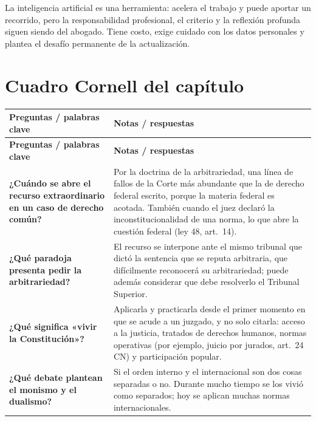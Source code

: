 \documentclass[12pt,oneside]{book}
\begin{document}
\begin{important}
La inteligencia artificial es una herramienta: acelera el trabajo y puede aportar un recorrido, pero la responsabilidad profesional, el criterio y la reflexión profunda siguen siendo del abogado. Tiene costo, exige cuidado con los datos personales y plantea el desafío permanente de la actualización.
\end{important}

\section{Cuadro Cornell del capítulo}

\begin{longtable}{>{\raggedright\arraybackslash}p{}>{\raggedright\arraybackslash}p{}}
\toprule
\textbf{Preguntas / palabras clave} & \textbf{Notas / respuestas} \\
\midrule
\endfirsthead
\toprule
\textbf{Preguntas / palabras clave} & \textbf{Notas / respuestas} \\
\midrule
\endhead

\textbf{¿Cuándo se abre el recurso extraordinario en un caso de derecho común?} &
Por la doctrina de la arbitrariedad, una línea de fallos de la Corte más abundante que la de derecho federal escrito, porque la materia federal es acotada. También cuando el juez declaró la inconstitucionalidad de una norma, lo que abre la cuestión federal (ley 48, art.~14). \\[0.6em]

\textbf{¿Qué paradoja presenta pedir la arbitrariedad?} &
El recurso se interpone ante el mismo tribunal que dictó la sentencia que se reputa arbitraria, que difícilmente reconocerá su arbitrariedad; puede además considerar que debe resolverlo el Tribunal Superior. \\[0.6em]

\textbf{¿Qué significa «vivir la Constitución»?} &
Aplicarla y practicarla desde el primer momento en que se acude a un juzgado, y no solo citarla: acceso a la justicia, tratados de derechos humanos, normas operativas (por ejemplo, juicio por jurados, art.~24 CN) y participación popular. \\[0.6em]

\textbf{¿Qué debate plantean el monismo y el dualismo?} &
Si el orden interno y el internacional son dos cosas separadas o no. Durante mucho tiempo se los vivió como separados; hoy se aplican muchas normas internacionales. \\[0.6em]


\end{longtable}
\end{document}
